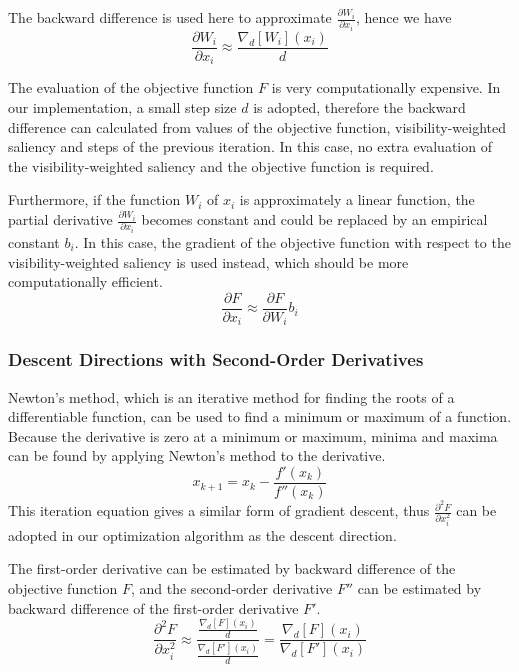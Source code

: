 The backward difference is used here to approximate $ \frac{\partial W_{i}}{\partial x_{i}} $, hence we have
\[ \frac{\partial W_{i}}{\partial x_{i}} \approx \frac{\nabla_{d}[W_{i}](x_{i})}{d} \]

The evaluation of the objective function $ F $ is very computationally expensive. In our implementation, a small step size $ d $ is adopted, therefore the backward difference can calculated from values of the objective function, visibility-weighted saliency and steps of the previous iteration. In this case, no extra evaluation of the visibility-weighted saliency and the objective function is required.

Furthermore, if the function $ W_{i} $ of $ x_{i} $ is approximately a linear function, the partial derivative $ \frac{\partial W_{i}}{\partial x_{i}} $ becomes constant and could be replaced by an empirical constant $ b_{i} $. In this case, the gradient of the objective function with respect to the visibility-weighted saliency is used instead, which should be more computationally efficient.
\[ \frac{\partial F}{\partial x_{i}} \approx \frac{\partial F}{\partial W_{i}} b_{i} \]

\subsubsection{Descent Directions with Second-Order Derivatives}
Newton's method, which is an iterative method for finding the roots of a differentiable function, can be used to find a minimum or maximum of a function. Because the derivative is zero at a minimum or maximum, minima and maxima can be found by applying Newton's method to the derivative.
\[ x_{k+1}=x_{k}- \frac{f'(x_{k})}{f''(x_{k})} \]
This iteration equation gives a similar form of gradient descent, thus $ \frac{\partial^2 F}{\partial x_{i}^2} $ can be adopted in our optimization algorithm as the descent direction.

The first-order derivative can be estimated by backward difference of the objective function $ F $, and the second-order derivative $ F'' $ can be estimated by backward difference of the first-order derivative $ F' $.
\[ \frac{\partial^2 F}{\partial x_{i}^2} 
\approx \dfrac{ \frac{\nabla_{d}[F](x_{i})}{d} }{ \frac{\nabla_{d}[F'](x_{i})}{d} }
= \frac{ \nabla_{d}[F](x_{i}) }{ \nabla_{d}[F'](x_{i}) } \]

